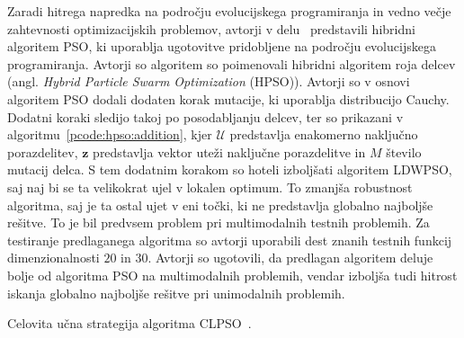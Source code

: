 Zaradi hitrega napredka na področju evolucijskega programiranja in vedno večje zahtevnosti optimizacijskih problemov, avtorji v delu~\cite{alg:mpso} predstavili hibridni algoritem PSO, ki uporablja ugotovitve pridobljene na področju evolucijskega programiranja.
Avtorji so algoritem so poimenovali hibridni algoritem roja delcev (angl. \textit{Hybrid Particle Swarm Optimization} (HPSO)).
Avtorji so v osnovi algoritem PSO dodali dodaten korak mutacije, ki uporablja distribucijo Cauchy.
Dodatni koraki sledijo takoj po posodabljanju delcev, ter so prikazani v algoritmu~\ref{pcode:hpso:addition}, kjer $\mathcal{U}$ predstavlja enakomerno naključno porazdelitev, $\mathbf{z}$ predstavlja vektor uteži naključne porazdelitve in $\mathit{M}$ število mutacij delca.
S tem dodatnim korakom so hoteli izboljšati algoritem LDWPSO, saj naj bi se ta velikokrat ujel v lokalen optimum.
To zmanjša robustnost algoritma, saj je ta ostal ujet v eni točki, ki ne predstavlja globalno najboljše rešitve.
To je bil predvsem problem pri multimodalnih testnih problemih.
Za testiranje predlaganega algoritma so avtorji uporabili dest znanih testnih funkcij dimenzionalnosti $20$ in $30$.
Avtorji so ugotovili, da predlagan algoritem deluje bolje od algoritma PSO na multimodalnih problemih, vendar izboljša tudi hitrost iskanja globalno najboljše rešitve pri unimodalnih problemih.

\begin{algorithm}
    \DontPrintSemicolon


    \caption{Celovita učna strategija algoritma CLPSO~\cite{alg:clpso}.}\label{pcode:clpso:learning}
\end{algorithm}

